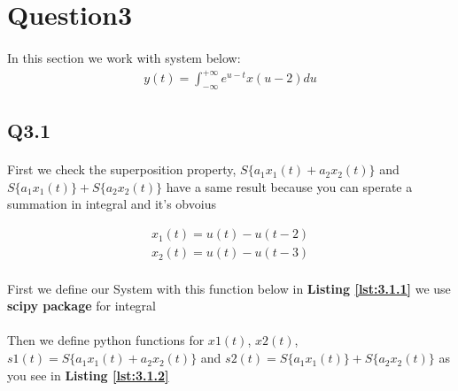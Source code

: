 \newpage
\section{Question3}
\paragraph{}In this section we work with system below:
\begin{align}
    y(t) = \int_{-\infty}^{+\infty} e^{u-t}x(u-2) du
    \label{y}
\end{align}

\subsection{Q3.1}
\paragraph{} First we check the superposition property,
$S\{a_1x_1(t)+a_2x_2(t)\}$ and $S\{a_1x_1(t)\}+ 
S\{a_2x_2(t)\}$ have a same result because you can sperate
a summation in integral and it's obvoius 

\begin{align}
    x_1(t) = u(t)-u(t-2) \label{x_1}\\
    x_2(t) = u(t)-u(t-3)
    \label{x_2}
\end{align}
\paragraph{} First we define our System with this 
function below in \textbf{Listing \ref{lst:3.1.1}} 
we use \textbf{scipy package} for integral
\vspace{2ex}

\vspace{2ex}

\paragraph{} Then we define python functions for $x1(t)$, $x2(t)$,
 $s1(t)=S\{a_1x_1(t)+a_2x_2(t)\}$ and $s2(t)=S\{a_1x_1(t)\}+ 
 S\{a_2x_2(t)\}$ as you see in \textbf{Listing \ref{lst:3.1.2}}

\vspace{2ex}

